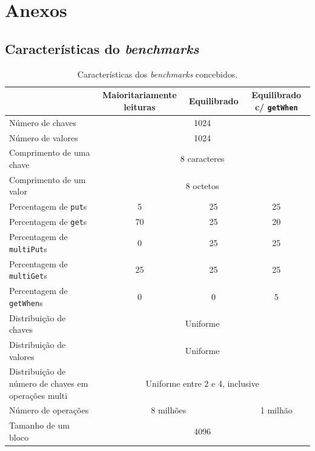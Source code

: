 \documentclass[11pt, a4paper]{article}
\begin{document}
\section{Anexos}

\subsection{Características do \emph{benchmarks}}
\label{benckmark-description}

\begin{table}[H]
    \begin{center}
        \begin{tabular}{|m{5cm}|c|c|c|}
            \hline & Maioritariamente leituras & Equilibrado & Equilibrado c/ \texttt{getWhen} \\

            \hline Número de chaves         & \multicolumn{3}{c|}{1024}         \\
            \hline Número de valores        & \multicolumn{3}{c|}{1024}         \\
            \hline Comprimento de uma chave & \multicolumn{3}{c|}{8 caracteres} \\
            \hline Comprimento de um valor  & \multicolumn{3}{c|}{8 octetos}    \\

            \hline Percentagem de \texttt{put}s      & 5  & 25 & 25 \\
            \hline Percentagem de \texttt{get}s      & 70 & 25 & 20 \\
            \hline Percentagem de \texttt{multiPut}s & 0  & 25 & 25 \\
            \hline Percentagem de \texttt{multiGet}s & 25 & 25 & 25 \\
            \hline Percentagem de \texttt{getWhen}s  & 0  & 0  & 5  \\

            \hline Distribuição de chaves  & \multicolumn{3}{c|}{Uniforme} \\
            \hline Distribuição de valores & \multicolumn{3}{c|}{Uniforme} \\
            \hline Distribuição de número de chaves em operações multi &
                \multicolumn{3}{c|}{Uniforme entre 2 e 4, inclusive} \\

            \hline Número de operações & \multicolumn{2}{c|}{8 milhões} & 1 milhão\footnotemark \\
            \hline Tamanho de um bloco & \multicolumn{3}{c|}{4096} \\
            \hline
        \end{tabular}
    \end{center}

    \caption{Características dos \emph{benchmarks} concebidos.}
\end{table}
\end{document}

